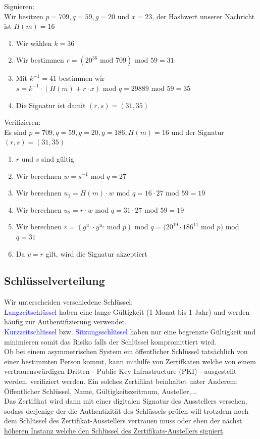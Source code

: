 \documentclass[a4paper,12pt,leqno]{article}
\newcommand{\blue}[1]{\textcolor{blue}{#1}}
\begin{document}
Signieren:\\
Wir besitzen $p=709,q=59,g=20$ und $x=23$, der Hashwert unserer Nachricht ist $H(m)=16$
\begin{enumerate}
\item Wir wählen $k=36$
\item Wir bestimmen $r=(20^{36}\textrm{ mod }709)\textrm{ mod }59=31$
\item Mit $k^{-1}=41$ bestimmen wir $s=k^{-1}\cdot (H(m)+r\cdot x)\textrm{ mod }q=29889\textrm{ mod }59=35$
\item Die Signatur ist damit $(r,s)=(31,35)$
\end{enumerate}

Verifizieren:\\
Es sind $p=709,q=59,g=20,y=186,H(m)=16$ und der Signatur $(r,s)=(31,35)$
\begin{enumerate}
\item $r$ und $s$ sind gültig
\item Wir berechnen $w=s^{-1}$ mod $q=27$
\item Wir berechnen $u_1=H(m)\cdot w$ mod $q=16\cdot 27$ mod $59=19$
\item Wir berechnen $u_2=r\cdot w$ mod $q=31\cdot 27$ mod $59=19$
\item Wir berechnen $v=(g^{u_1}\cdot y^{u_2}\textrm{ mod }p)$ mod $q=(20^{19}\cdot 186^{11}$ mod $p)$ mod $q =31$
\item Da $v=r$ gilt, wird die Signatur akzeptiert
\end{enumerate}

\subsection{Schlüsselverteilung}
Wir unterscheiden verschiedene Schlüssel:\\
\blue{Langzeitschlüssel} haben eine lange Gültigkeit (1 Monat bis 1 Jahr) und werden häufig zur Authentifizierung verwendet.\\
\blue{Kurzzeitschlüssel} bzw. \blue{Sitzungsschlüssel} haben nur eine begrenzte Gültigkeit und minimieren somit das Risiko falls der Schlüssel kompromittiert wird.\\

Ob bei einem asymmetrischen System ein öffentlicher Schlüssel tatsächlich von einer bestimmten Person kommt, kann mithilfe von Zertifkaten welche von einem vertrauenswürdigen Dritten - Public Key Infrastructure (PKI) - ausgestellt werden, verifiziert werden.
Ein solches Zertifikat beinhaltet unter Anderem: Öffentlicher Schlüssel, Name, Gültigkeitszeitraum, Austeller,...\\
Das Zertifikat wird dann mit einer digitalen Signatur des Ausstellers versehen, sodass derjenige der die Authentizität des Schlüssels prüfen will trotzdem noch dem Schlüssel des Zertifikat-Ausstellers vertrauen muss oder eben der nächst \hyperref[pic:Chainoftrust]{höheren Instanz welche den Schlüssel des Zertifikats-Austellers signiert}.
\end{document}
